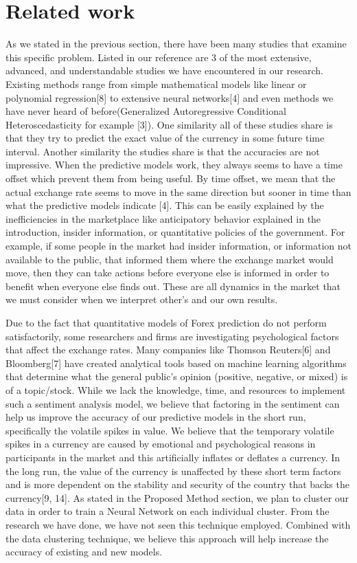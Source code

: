 \documentclass[twoside]{article}
\begin{document}

\section{Related work}

As we stated in the previous section, there have been many studies that examine this specific problem. Listed in our reference are 3 of the most extensive, advanced, and understandable studies we have encountered in our research. Existing methods range from simple mathematical models like linear or polynomial regression[8] to extensive neural networks[4] and even methods we have never heard of before(Generalized Autoregressive Conditional Heteroscedasticity for example [3]). One similarity all of these studies share is that they try to predict the exact value of the currency in some future time interval. Another similarity the studies share is that the accuracies are not impressive. When the predictive models work, they always seems to have a time offset which prevent them from being useful. By time offset, we mean that the actual exchange rate seems to move in the same direction but sooner in time than what the predictive models indicate [4]. This can be easily explained by the inefficiencies in the marketplace like anticipatory behavior explained in the introduction, insider information, or quantitative policies of the government. For example, if some people in the market had insider information, or information not available to the public, that informed them where the exchange market would move, then they can take actions before everyone else is informed in order to benefit when everyone else finds out. These are all dynamics in the market that we must consider when we interpret other’s and our own results.

Due to the fact that quantitative models of Forex prediction do not perform satisfactorily, some researchers and firms are investigating psychological factors that affect the exchange rates. Many companies like Thomson Reuters[6] and Bloomberg[7] have created analytical tools based on machine learning algorithms that determine what the general public’s opinion (positive, negative, or mixed) is of a topic/stock. While we lack the knowledge, time, and resources to implement such a sentiment analysis model, we believe that factoring in the sentiment can help us improve the accuracy of our predictive models in the short run, specifically the volatile spikes in value. We believe that the temporary volatile spikes in a currency are caused by emotional and psychological reasons in participants in the market and this artificially inflates or deflates a currency. In the long run, the value of the currency is unaffected by these short term factors and is more dependent on the stability and security of the country that backs the currency[9, 14].
As stated in the Proposed Method section, we plan to cluster our data in order to train a Neural Network on each individual cluster. From the research we have done, we have not seen this technique employed. Combined with the data clustering technique, we believe this approach will help increase the accuracy of existing and new models.
\end{document}
